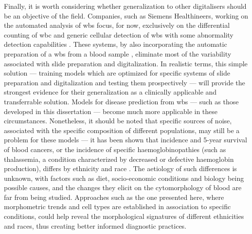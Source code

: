 Finally, it is worth considering whether generalization to other digitalisers should be an objective of the field. Companies, such as Siemens Healthineers, working on the automated analysis of \ac{wbs} focus, for now, exclusively on the differential counting of \ac{wbc} and generic cellular detection of \ac{wbs} with some abnormality detection capabilities \cite{cellavision,advia-120}. These systems, by also incorporating the automatic preparation of a \ac{wbs} from a blood sample \cite{advia-120}, eliminate most of the variability associated with slide preparation and digitalization. In realistic terms, this simple solution --- training models which are optimized for specific systems of slide preparation and digitalization and testing them prospectively --- will provide the strongest evidence for their generalization as a clinically applicable and transferrable solution. Models for disease prediction from \ac{wbs} --- such as those developed in this dissertation --- become much more applicable in these circumstances. Nonetheless, it should be noted that specific sources of noise, associated with the specific composition of different populations, may still be a problem for these models --- it has been shown that incidence and 5-year survival of blood cancers, or the incidence of specific haemoglobinopathies (such as thalassemia, a condition characterized by decreased or defective haemoglobin production), differs by ethnicity and race \cite{Kirtane2017-dh,Lorey1996-yc}. The aetiology of such differences is unknown, with factors such as diet, socio-economic conditions and biology being possible causes, and the changes they elicit on the cytomorphology of blood are far from being studied. Approaches such as the one presented here, where morphometric trends and cell types are established in association to specific conditions, could help reveal the morphological signatures of different ethnicities and races, thus creating better informed diagnostic practices.